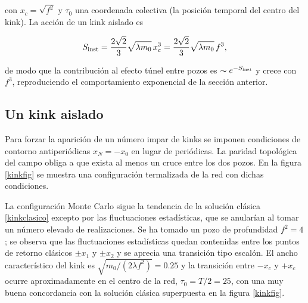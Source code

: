 \documentclass[11pt,a4paper,twoside,pdf]{article}
\numberwithin{equation}{section}
\begin{document}
con $x_c = \sqrt{f^2}$ y $\tau_0$ una coordenada colectiva (la posición temporal del centro del kink). La acción de un kink aislado es

\begin{equation}
    S_{\rm inst} = \frac{2\sqrt{2}}{3}\sqrt{\lambda m_0}\, x_c^3 = \frac{2\sqrt{2}}{3}\sqrt{\lambda m_0}\, f^3,
\end{equation}

de modo que la contribución al efecto túnel entre pozos es $\sim e^{-S_{\rm inst}}$ y crece con $f^3$, reproduciendo el comportamiento exponencial de la sección anterior.



\subsection{Un kink aislado}


Para forzar la aparición de un número impar de kinks se imponen condiciones de contorno antiperiódicas $x_N = -x_0$ en lugar de periódicas. La paridad topológica del campo obliga a que exista al menos un cruce entre los dos pozos. En la figura \ref{kinkfig} se muestra una configuración termalizada de la red con dichas condiciones.\medskip



La configuración Monte Carlo sigue la tendencia de la solución clásica \ref{kinkclasico} excepto por las fluctuaciones estadísticas, que se anularían al tomar un número elevado de realizaciones. Se ha tomado un pozo de profundidad $f^2=4$; se observa que las fluctuaciones estadísticas quedan contenidas entre los puntos de retorno clásicos $\pm x_1$ y $\pm x_2$ y se aprecia una transición tipo escalón. El ancho característico del kink es $\sqrt{m_0/(2\lambda f^2)} = 0.25$ y la transición entre $-x_c$ y $+x_c$ ocurre aproximadamente en el centro de la red, $\tau_0 = T/2 = 25$, con una muy buena concordancia con la solución clásica superpuesta en la figura \ref{kinkfig}.
\end{document}
